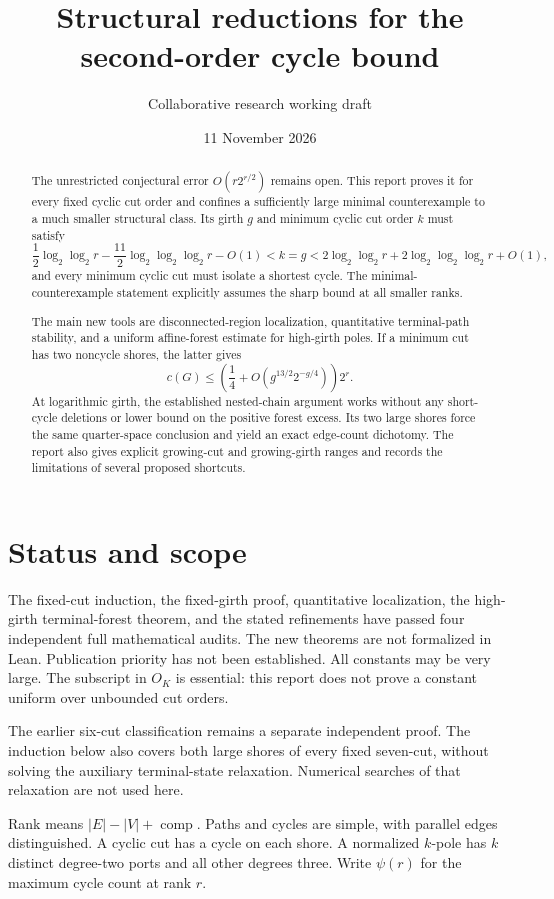 \documentclass[11pt]{article}
\title{Structural reductions for the second-order cycle bound}
\author{Collaborative research working draft}
\date{11 November 2026}
\begin{document}
\maketitle
\begin{abstract}
The unrestricted conjectural error $O(r2^{r/2})$ remains open.
This report proves it for every fixed cyclic cut order and confines a sufficiently large minimal counterexample to a much smaller structural class.
Its girth $g$ and minimum cyclic cut order $k$ must satisfy
\[
 \frac12\log_2\log_2r-\frac{11}{2}\log_2\log_2\log_2r-O(1)
 <k=g
 <2\log_2\log_2r+2\log_2\log_2\log_2r+O(1),
\]
and every minimum cyclic cut must isolate a shortest cycle.
The minimal-counterexample statement explicitly assumes the sharp bound at all smaller ranks.

The main new tools are disconnected-region localization, quantitative terminal-path stability, and a uniform affine-forest estimate for high-girth poles.
If a minimum cut has two noncycle shores, the latter gives
\[
 c(G)\le\left(\frac14+O(g^{13/2}2^{-g/4})\right)2^r.
\]
At logarithmic girth, the established nested-chain argument works without any short-cycle deletions or lower bound on the positive forest excess.
Its two large shores force the same quarter-space conclusion and yield an exact edge-count dichotomy.
The report also gives explicit growing-cut and growing-girth ranges and records the limitations of several proposed shortcuts.
\end{abstract}

\section*{Status and scope}
The fixed-cut induction, the fixed-girth proof, quantitative localization, the high-girth terminal-forest theorem, and the stated refinements have passed four independent full mathematical audits.
The new theorems are not formalized in Lean.
Publication priority has not been established.
All constants may be very large.
The subscript in $O_K$ is essential: this report does not prove a constant uniform over unbounded cut orders.

The earlier six-cut classification remains a separate independent proof.
The induction below also covers both large shores of every fixed seven-cut, without solving the auxiliary terminal-state relaxation.
Numerical searches of that relaxation are not used here.

Rank means $|E|-|V|+\operatorname{comp}$.
Paths and cycles are simple, with parallel edges distinguished.
A cyclic cut has a cycle on each shore.
A normalized $k$-pole has $k$ distinct degree-two ports and all other degrees three.
Write $\psi(r)$ for the maximum cycle count at rank $r$.
\end{document}
